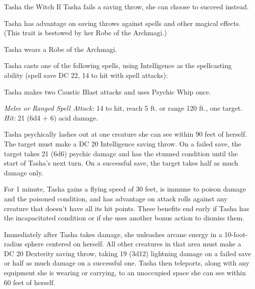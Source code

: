 \documentclass[10pt,a4paper,twoside,bg=print,twocolumn,openany,nodeprecatedcode]{dndbook}
\begin{document}
\begin{DndMonster}[float=t]{Tasha the Witch}
\DndMonsterBasics[
armor-class = {19 (\textit{robe of the archmagi})},
hit-points = {\DndDice{28d8 + 84}},
speed = {30 ft.}
]
\DndMonsterAbilityScores[
 str = 10,
 dex = 18,
 con = 17,
 int = 23,
 wis = 12,
 cha = 22
]
\DndMonsterDetails[
saving-throws = {Int +12, Wis +7, Cha +12},
skills = {Arcana +18, History +12, Persuasion +12},
condition-immunities = {charmed, frightened},
languages = {Abyssal, Celestial, Common, Draconic, Elvish, Infernal, Sylvan},
challenge = 19,
]
If Tasha fails a saving throw, she can choose to succeed instead.

Tasha has advantage on saving throws against spells and other magical effects. (This trait is bestowed by her Robe of the Archmagi.)

Tasha wears a Robe of the Archmagi.

Tasha casts one of the following spells, using Intelligence as the spellcasting ability (spell save DC 22, 14 to hit with spell attacks):
\begin{DndMonsterSpells}
\end{DndMonsterSpells}
Tasha makes two Caustic Blast attacks and uses Psychic Whip once.

\textsl{Melee or Ranged Spell Attack:} 14 to hit, reach 5 ft. or range 120 ft., one target. \textsl{Hit:} 21 (6d4 + 6) acid damage.

Tasha psychically lashes out at one creature she can see within 90 feet of herself. The target must make a DC 20 Intelligence saving throw. On a failed save, the target takes 21 (6d6) psychic damage and has the stunned condition until the start of Tasha's next turn. On a successful save, the target takes half as much damage only.

For 1 minute, Tasha gains a flying speed of 30 feet, is immune to poison damage and the poisoned condition, and has advantage on attack rolls against any creature that doesn't have all its hit points. These benefits end early if Tasha has the incapacitated condition or if she uses another bonus action to dismiss them.

Immediately after Tasha takes damage, she unleashes arcane energy in a 10-foot-radius sphere centered on herself. All other creatures in that area must make a DC 20 Dexterity saving throw, taking 19 (3d12) lightning damage on a failed save or half as much damage on a successful one. Tasha then teleports, along with any equipment she is wearing or carrying, to an unoccupied space she can see within 60 feet of herself.

\end{DndMonster}
\end{document}
